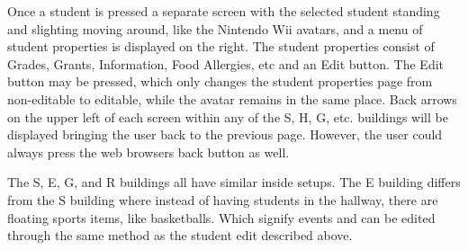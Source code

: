 \documentclass[11pt]{article}
\begin{document}
Once a student is pressed a separate screen with the selected student standing and slighting moving around, like the Nintendo Wii avatars, and a menu of student properties is displayed on the right. The student properties consist of Grades, Grants, Information, Food Allergies, etc and an Edit button. The Edit button may be pressed, which only changes the student properties page from non-editable to editable, while the avatar remains in the same place. Back arrows on the upper left of each screen within any of the S, H, G, etc. buildings will be displayed bringing the user back to the previous page. However, the user could always press the web browsers back button as well.

The S, E, G, and R buildings all have similar inside setups. The E building differs from the S building where instead of having students in the hallway, there are floating sports items, like basketballs. Which signify events and can be edited through the same method as the student edit described above. 
\end{document}
